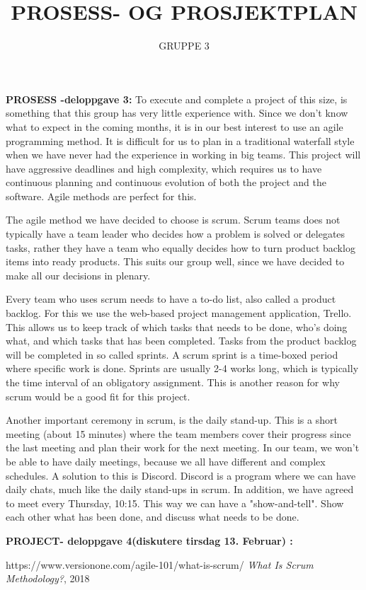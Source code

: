 \documentclass{article}
\begin{document}
\title{PROSESS- OG PROSJEKTPLAN}
\author{GRUPPE 3}


\maketitle


\raggedright

\textbf{PROSESS -deloppgave 3:}
To execute and complete a project of this size, is something that this group has very little experience with. Since we don't know what to expect in the coming months, it is in our best interest to use an agile programming method. It is difficult for us to plan in a traditional waterfall style when we have never had the experience in working in big teams. This project will have aggressive deadlines and high complexity, which requires us to have continuous planning and continuous evolution of both the project and the software. Agile methods are perfect for this. \bigskip

The agile method we have decided to choose is scrum. Scrum teams does not typically have a team leader who decides how a problem is solved or delegates tasks, rather they have a team who equally decides how to turn product backlog items into ready products. This suits our group well, since we have decided to make all our decisions in plenary. \bigskip

Every team who uses scrum needs to have a to-do list, also called a product backlog. For this we use the web-based project management application, Trello. This allows us to keep track of which tasks that needs to be done, who's doing what, and which tasks that has been completed. Tasks from the product backlog will be completed in so called sprints. A scrum sprint is a time-boxed period where specific work is done. Sprints are usually 2-4 works long, which is typically the time interval of an obligatory assignment. This is another reason for why scrum would be a good fit for this project. \bigskip

Another important ceremony in scrum, is the daily stand-up. This is a short meeting (about 15 minutes) where the team members cover their progress since the last meeting and plan their work for the next meeting. In our team, we won't be able to have daily meetings, because we all have different and complex schedules. A solution to this is Discord. Discord is a program where we can have daily chats, much like the daily stand-ups in scrum. In addition, we have agreed to meet every Thursday, 10:15. This way we can have a "show-and-tell". Show each other what has been done, and discuss what needs to be done.  \bigskip
 
\textbf{PROJECT- deloppgave 4(diskutere tirsdag 13. Februar) :} 
 
 \begin{thebibliography}{9}

  https://www.versionone.com/agile-101/what-is-scrum/
  \textit{ What Is Scrum Methodology?},
  2018


\end{thebibliography}
\end{document}
